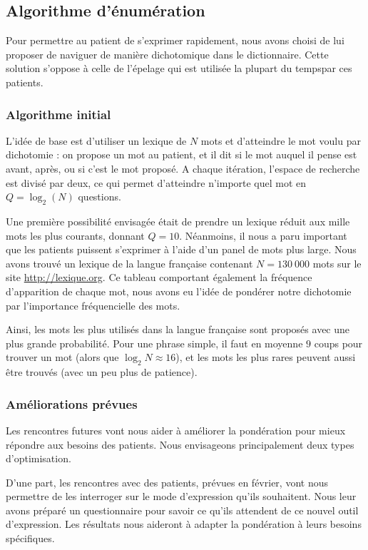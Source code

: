 \documentclass[12pt]{article}
\begin{document}
\subsection{Algorithme d'énumération}
Pour permettre au patient de s'exprimer rapidement, nous avons choisi de lui proposer de naviguer de manière dichotomique dans le dictionnaire. Cette solution s'oppose à celle de l'épelage qui est utilisée la plupart du tempspar ces patients.
\subsubsection{Algorithme initial}
L'idée de base est d'utiliser un lexique de $N$ mots et d'atteindre le mot voulu par dichotomie : on propose un mot au patient, et il dit si le mot auquel il pense est avant, après, ou si c'est le mot proposé. A chaque itération, l'espace de recherche est divisé par deux, ce qui permet d'atteindre n'importe quel mot en $Q=\log_2(N)$ questions.

Une première possibilité envisagée était de prendre un lexique réduit aux mille mots les plus courants, donnant $Q=10$. Néanmoins, il nous a paru important que les patients puissent s'exprimer à l'aide d'un panel de mots plus large. Nous avons trouvé un lexique de la langue française contenant $N=130\ 000$ mots sur le site \url{http://lexique.org}. Ce tableau comportant également la fréquence d'apparition de chaque mot, nous avons eu l'idée de pondérer notre dichotomie par l'importance fréquencielle des mots.

Ainsi, les mots les plus utilisés dans la langue française sont proposés avec une plus grande probabilité. Pour une phrase simple, il faut en moyenne $9$ coups pour trouver un mot (alors que $\log_2N\approx 16$), et les mots les plus rares peuvent aussi être trouvés (avec un peu plus de patience).

\subsubsection{Améliorations prévues}
Les rencontres futures vont nous aider à améliorer la pondération pour mieux répondre aux besoins des patients. Nous envisageons principalement deux types d'optimisation.

D'une part, les rencontres avec des patients, prévues en février, vont nous permettre de les interroger sur le mode d'expression qu'ils souhaitent. Nous leur avons préparé un questionnaire pour savoir ce qu'ils attendent de ce nouvel outil d'expression. Les résultats nous aideront à adapter la pondération à leurs besoins spécifiques.
\end{document}
